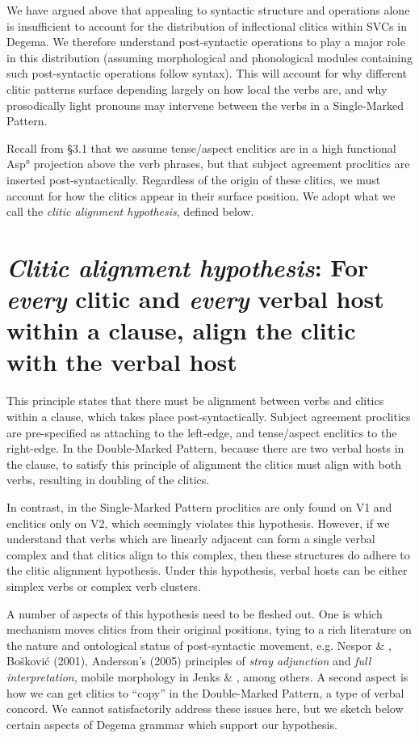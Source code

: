 \documentclass[output=paper]{langsci/langscibook}
\begin{document}
We have argued above that appealing to syntactic structure and operations alone is insufficient to account for the distribution of inflectional clitics within SVCs in Degema. We therefore understand post-syntactic operations to play a major role in this distribution (assuming morphological and phonological modules containing such post-syntactic operations follow syntax). This will account for why different clitic patterns surface depending largely on how local the verbs are, and why prosodically light pronouns may intervene between the verbs in a Single-Marked Pattern. 

Recall from §3.1 that we assume tense/aspect enclitics are in a high functional Asp° projection above the verb phrases, but that subject agreement proclitics are inserted post-syntactically. Regardless of the origin of these clitics, we must account for how the clitics appear in their surface position. We adopt what we call the \textit{clitic alignment hypothesis}, defined below. 

\section{\textit{Clitic alignment hypothesis}: For \textit{every} clitic and \textit{every} verbal host within a clause, align the clitic with the verbal host}

This principle states that there must be alignment between verbs and clitics within a clause, which takes place post-syntactically. Subject agreement proclitics are pre-specified as attaching to the left-edge, and tense/aspect enclitics to the right-edge. In the Double-Marked Pattern, because there are two verbal hosts in the clause, to satisfy this principle of alignment the clitics must align with both verbs, resulting in doubling of the clitics. 

In contrast, in the Single-Marked Pattern proclitics are only found on V1 and enclitics only on V2, which seemingly violates this hypothesis. However, if we understand that verbs which are linearly adjacent can form a single verbal complex and that clitics align to this complex, then these structures do adhere to the clitic alignment hypothesis. Under this hypothesis, verbal hosts can be either simplex verbs or complex verb clusters.

  A number of aspects of this hypothesis need to be fleshed out. One is which mechanism moves clitics from their original positions, tying to a rich literature on the nature and ontological status of post-syntactic movement, e.g. Nespor \& \citet{Vogel1986}, Bošković (2001), Anderson’s (2005) principles of \textit{stray adjunction }and\textit{ full interpretation}, mobile morphology in Jenks \& \citet{Rose2015}, among others. A second aspect is how we can get clitics to “copy” in the Double-Marked Pattern, a type of verbal concord. We cannot satisfactorily address these issues here, but we sketch below certain aspects of Degema grammar which support our hypothesis. 
\end{document}
